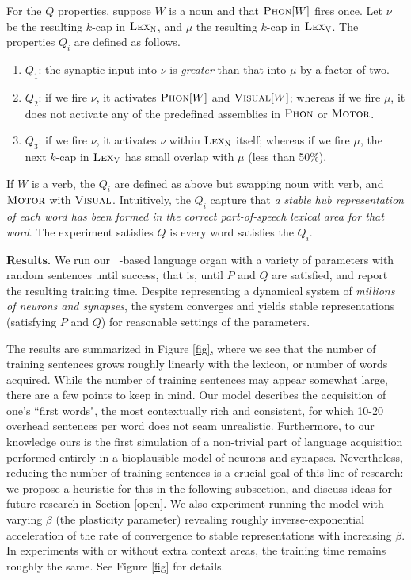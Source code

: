 \documentclass{article}
\newcommand{\LexV}{\textsc{Lex}_{\textsc{V}}}
\newcommand{\LexN}{\textsc{Lex}_{\textsc{N}}}
\newcommand{\Phon}{\textsc{Phon}}
\newcommand{\Visual}{\textsc{Visual}}
\newcommand{\Motor}{\textsc{Motor}}
\begin{document}
For the $Q$ properties, suppose $W$ is a noun and that $\Phon[W]$ fires once. Let $\nu$ be the resulting $k$-cap in $\LexN$, and $\mu$ the resulting $k$-cap in $\LexV$. The properties $Q_i$ are defined as follows.
\begin{enumerate}
\item $Q_1$: the synaptic input into $\nu$ is \emph{greater} than that into $\mu$ by a factor of two. 
\item $Q_2$: if we fire $\nu$, it activates $\Phon[W]$ and $\Visual[W]$; whereas if we fire $\mu$, it does not activate any of the predefined assemblies in $\Phon$ or $\Motor$.
\item $Q_3$: if we fire $\nu$, it activates $\nu$ within $\LexN$ itself; whereas if we fire $\mu$, the next $k$-cap in $\LexV$ has small overlap with $\mu$ (less than 50\%).
\end{enumerate}
If $W$ is a verb, the $Q_i$ are defined as above but swapping noun with verb, and $\Motor$ with $\Visual$. Intuitively, the $Q_i$ capture that \emph{a stable hub representation of each word has been formed in the correct part-of-speech lexical area for that word}. The experiment satisfies $Q$ is every word satisfies the $Q_i$.

\textbf{Results.} \label{results}
We run our \name~-based language organ with a variety of parameters with random sentences until success, that is, until $P$ and $Q$ are satisfied, and report the resulting training time. Despite representing a dynamical system of \emph{millions of neurons and synapses}, the system converges and yields stable representations (satisfying $P$ and $Q$) for reasonable settings of the parameters.

The results are summarized in Figure \ref{fig}, where we see that the number of training sentences grows roughly linearly with the lexicon, or number of words acquired. While the number of training sentences may appear somewhat large, there are a few points to keep in mind. Our model describes the acquisition of one's ``first words", the most contextually rich and consistent, for which 10-20 overhead sentences per word does not seam unrealistic. Furthermore, to our knowledge ours is the first simulation of a non-trivial part of language acquisition performed entirely in a bioplausible model of neurons and synapses. Nevertheless, reducing the number of training sentences is a crucial goal of this line of research: we propose a heuristic for this in the following subsection, and discuss ideas for future research in Section \ref{open}. We also experiment running the model with varying $\beta$ (the plasticity parameter) revealing roughly inverse-exponential acceleration of the rate of convergence to stable representations with increasing $\beta$. In experiments with or without extra context areas, the training time remains roughly the same. See Figure \ref{fig} for details.
\end{document}
